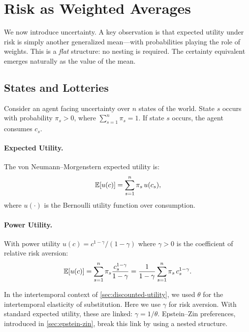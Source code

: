 \section{Risk as Weighted Averages}
\label{sec:risk-weighted-averages}

We now introduce uncertainty. A key observation is that expected utility under risk is simply another generalized mean---with probabilities playing the role of weights. This is a \emph{flat} structure: no nesting is required. The certainty equivalent emerges naturally as the value of the mean.

\subsection{States and Lotteries}
\label{subsec:states-lotteries}

Consider an agent facing uncertainty over $n$ states of the world. State $s$ occurs with probability $\pi_s > 0$, where $\sum_{s=1}^{n} \pi_s = 1$. If state $s$ occurs, the agent consumes $c_s$.

\paragraph{Expected Utility.}
The von Neumann--Morgenstern expected utility is:
\begin{equation}
\mathbb{E}[u(c)] = \sum_{s=1}^{n} \pi_s \, u(c_s),
\label{eq:expected-utility}
\end{equation}
where $u(\cdot)$ is the Bernoulli utility function over consumption.

\paragraph{Power Utility.}
With power utility $u(c) = c^{1-\gamma}/(1-\gamma)$ where $\gamma > 0$ is the coefficient of relative risk aversion:
\begin{equation}
\mathbb{E}[u(c)] = \sum_{s=1}^{n} \pi_s \frac{c_s^{1-\gamma}}{1-\gamma} = \frac{1}{1-\gamma} \sum_{s=1}^{n} \pi_s \, c_s^{1-\gamma}.
\label{eq:expected-power-utility}
\end{equation}

\begin{calloutnote}
In the intertemporal context of \cref{sec:discounted-utility}, we used $\theta$ for the intertemporal elasticity of substitution. Here we use $\gamma$ for risk aversion. With standard expected utility, these are linked: $\gamma = 1/\theta$. Epstein--Zin preferences, introduced in \cref{sec:epstein-zin}, break this link by using a nested structure.
\end{calloutnote}

